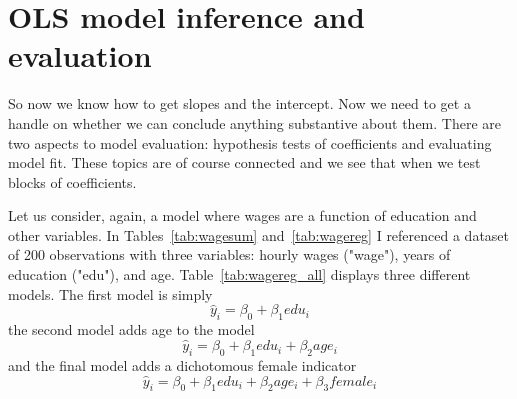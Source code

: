 \chapter{OLS model inference and evaluation}
So now we know how to get slopes and the intercept. Now we need to get a handle on whether we can conclude anything substantive about them. There are two aspects to model evaluation: hypothesis tests of coefficients and evaluating model fit. These topics are of course connected and we see that when we test blocks of coefficients.

Let us consider, again, a model where wages are a function of education and other variables. In Tables~\ref{tab:wagesum} and~\ref{tab:wagereg} I referenced a dataset of 200 observations with three variables: hourly wages ("wage"), years of education ("edu"), and age. Table~\ref{tab:wagereg_all} displays three different models. The first model is simply
\begin{equation}
\hat{y}_i=\beta_0+\beta_1edu_i
\end{equation}
the second model adds age to the model
\begin{equation}
\hat{y}_i=\beta_0+\beta_1edu_i+\beta_2age_i
\end{equation}
and the final model adds a dichotomous female indicator
\begin{equation}
\hat{y}_i=\beta_0+\beta_1edu_i+\beta_2age_i+\beta_3female_i
\end{equation}
